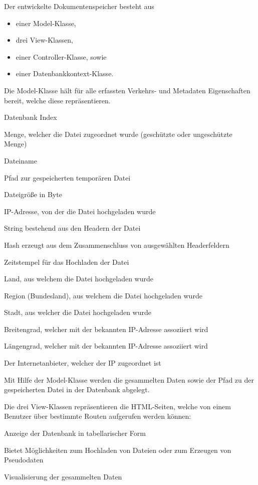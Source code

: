 \documentclass[
    fontsize=12pt,
    headings=small,
    parskip=half,           %
    bibliography=totoc,
    numbers=noenddot,       %
    open=any,               %
    ]{scrreprt}
\begin{document}
Der entwickelte Dokumentenspeicher besteht aus
\begin{itemize}
\item einer Model-Klasse,
\item drei View-Klassen,
\item einer Controller-Klasse, sowie
\item einer Datenbankkontext-Klasse.
\end{itemize}

Die Model-Klasse hält für alle erfassten Verkehrs- und Metadaten Eigenschaften bereit, welche diese repräsentieren.

\begin{description}[style=nextline]
\item[ID] Datenbank Index
\item[Set] Menge, welcher die Datei zugeordnet wurde (geschützte oder ungeschützte Menge)
\item[Filename] Dateiname
\item[Filepath] Pfad zur gespeicherten temporären Datei
\item[Size] Dateigröße in Byte
\item[IPAddress]  IP-Adresse, von der die Datei hochgeladen wurde
\item[Headers] String bestehend aus den Headern der Datei
\item[HeaderFingerprint] Hash erzeugt aus dem Zusammenschluss von ausgewählten Headerfeldern
\item[DateTime] Zeitstempel für das Hochladen der Datei
\item[Country] Land, aus welchem die Datei hochgeladen wurde
\item[RegionName] Region (Bundesland), aus welchem die Datei hochgeladen wurde
\item[City] Stadt, aus welcher die Datei hochgeladen wurde
\item[Lat] Breitengrad, welcher mit der bekannten IP-Adresse assoziiert wird
\item[Lon] Längengrad, welcher mit der bekannten IP-Adresse assoziiert wird
\item[ISP] Der Internetanbieter, welcher der IP zugeordnet ist
\end{description}

Mit Hilfe der Model-Klasse werden die gesammelten Daten sowie der Pfad zu der gespeicherten Datei in der Datenbank abgelegt.

Die drei View-Klassen repräsentieren die HTML-Seiten, welche von einem Benutzer über bestimmte Routen aufgerufen werden können:
\begin{description}[style=nextline] 
\item[/FileEntry] Anzeige der Datenbank in tabellarischer Form
\item[/FileEntryCreate] Bietet Möglichkeiten zum Hochladen von Dateien oder zum Erzeugen von Pseudodaten
\item[/FileEntryVisual] Visualisierung der gesammelten Daten
\end{description}
\end{document}
